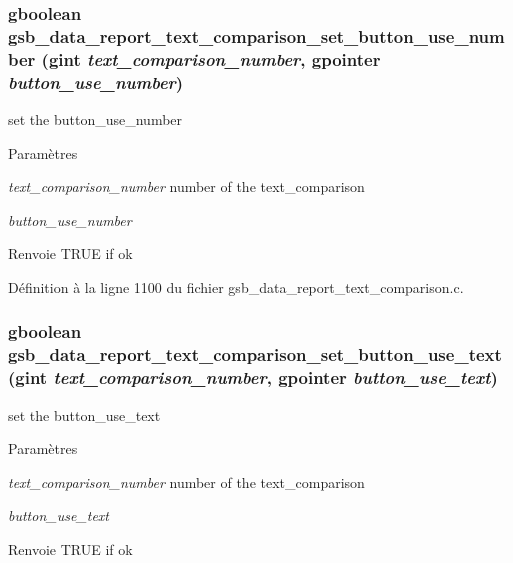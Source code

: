 \subsubsection[{gsb\_\-data\_\-report\_\-text\_\-comparison\_\-set\_\-button\_\-use\_\-number}]{\setlength{\rightskip}{0pt plus 5cm}gboolean gsb\_\-data\_\-report\_\-text\_\-comparison\_\-set\_\-button\_\-use\_\-number (gint {\em text\_\-comparison\_\-number}, \/  gpointer {\em button\_\-use\_\-number})}\label{gsb__data__report__text__comparison_8h_a80d0fb29d16d8710ee68066879f0218c}
set the button\_\-use\_\-number


\begin{DoxyParams}{Paramètres}
\item[{\em text\_\-comparison\_\-number}]number of the text\_\-comparison \item[{\em button\_\-use\_\-number}]\end{DoxyParams}
\begin{DoxyReturn}{Renvoie}
TRUE if ok 
\end{DoxyReturn}


Définition à la ligne 1100 du fichier gsb\_\-data\_\-report\_\-text\_\-comparison.c.

\subsubsection[{gsb\_\-data\_\-report\_\-text\_\-comparison\_\-set\_\-button\_\-use\_\-text}]{\setlength{\rightskip}{0pt plus 5cm}gboolean gsb\_\-data\_\-report\_\-text\_\-comparison\_\-set\_\-button\_\-use\_\-text (gint {\em text\_\-comparison\_\-number}, \/  gpointer {\em button\_\-use\_\-text})}\label{gsb__data__report__text__comparison_8h_a609be69e50d2b077d9833579484f56dd}
set the button\_\-use\_\-text


\begin{DoxyParams}{Paramètres}
\item[{\em text\_\-comparison\_\-number}]number of the text\_\-comparison \item[{\em button\_\-use\_\-text}]\end{DoxyParams}
\begin{DoxyReturn}{Renvoie}
TRUE if ok 
\end{DoxyReturn}


